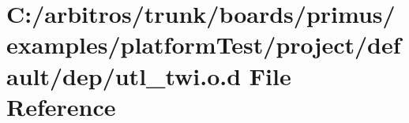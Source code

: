 \hypertarget{platform_test_2project_2default_2dep_2utl__twi_8o_8d}{\section{C\-:/arbitros/trunk/boards/primus/examples/platform\-Test/project/default/dep/utl\-\_\-twi.o.\-d File Reference}
\label{platform_test_2project_2default_2dep_2utl__twi_8o_8d}
}
